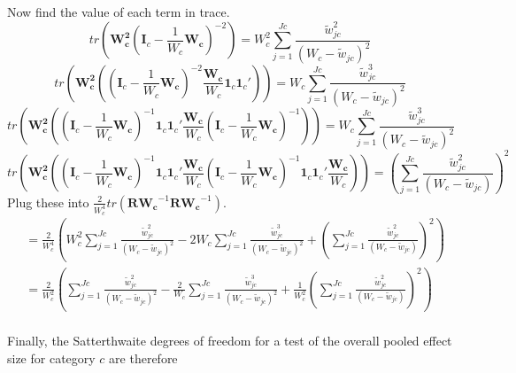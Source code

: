 Now find the value of each term in trace. 
\begin{equation}
    tr\left( \mathbf{W^2_c}\left(\mathbf{I}_c - \frac{1}{W_c} \mathbf{W_c} \right)^{-2} \right) = W^2_c \sum_{j=1}^{Jc} \frac{\tilde{w}_{jc}^2}{(W_c-\tilde{w}_{jc})^2} 
    \nonumber
\end{equation}
\begin{equation}
    tr\left(\mathbf{W_c^2}\left(\left(\mathbf{I}_c - \frac{1}{W_c} \mathbf{W_c} \right)^{-2}\frac{\mathbf{W_c} }{W_c}  \mathbf{1}_c\mathbf{1}_c' \right) \right) =W_c\sum_{j=1}^{Jc} \frac{\tilde{w}_{jc}^3}{(W_c-\tilde{w}_{jc} )^2} 
    \nonumber
\end{equation}
\begin{equation}
    tr\left(\mathbf{W_c^2}\left(\left(\mathbf{I}_c - \frac{1}{W_c} \mathbf{W_c} \right)^{-1} \mathbf{1}_c\mathbf{1}_c'\frac{\mathbf{W_c}}{W_c}\left(\mathbf{I}_c - \frac{1}{W_c} \mathbf{W_c} \right)^{-1}  \right) \right) =W_c\sum_{j=1}^{Jc} \frac{\tilde{w}_{jc}^3}{(W_c-\tilde{w}_{jc})^2} 
    \nonumber
\end{equation}
\begin{equation}
    tr\left(\mathbf{W_c^2}\left(\left(\mathbf{I}_c - \frac{1}{W_c} \mathbf{W_c} \right)^{-1}  \mathbf{1}_c\mathbf{1}_c'\frac{\mathbf{W_c}}{W_c} \left(\mathbf{I}_c - \frac{1}{W_c} \mathbf{W_c} \right)^{-1} \mathbf{1}_c\mathbf{1}_c'\frac{\mathbf{W_c}}{W_c} \right) \right) =\left(\sum_{j=1}^{Jc} \frac{\tilde{w}_{jc}^2}{(W_c-\tilde{w}_{jc})} \right)^2
    \nonumber
\end{equation}
Plug these into $\frac{2}{W_c^4}tr(\mathbf{R}\mathbf{W_c}^{-1}\mathbf{R}\mathbf{W_c}^{-1})$.
\begin{equation}
    \begin{split}
        & = \frac{2}{W_c^4} \left(W_c^2 \sum_{j=1}^{Jc} \frac{\tilde{w}_{jc}^2}{(W_c-\tilde{w}_{jc})^2} - 2W_c\sum_{j=1}^{Jc} \frac{\tilde{w}_{jc}^3}{(W_c-\tilde{w}_{jc})^2} + \left(\sum_{j=1}^{Jc} \frac{\tilde{w}_{jc}^2}{(W_c-\tilde{w}_{jc})} \right)^2\right) \\
        & = \frac{2}{W_c^2} \left( \sum_{j=1}^{Jc} \frac{\tilde{w}_{jc}^2}{(W_c-\tilde{w}_{jc})^2} - \frac{2}{W_c}\sum_{j=1}^{Jc} \frac{\tilde{w}_{jc}^3}{(W_c-\tilde{w}_{jc})^2} + \frac{1}{W_c^2}\left(\sum_{j=1}^{Jc} \frac{\tilde{w}_{jc}^2}{(W_c-\tilde{w}_{jc})} \right)^2\right) \\
    \end{split}
    \nonumber
\end{equation}

Finally, the Satterthwaite degrees of freedom for a test of the overall pooled effect size for category $c$ are therefore

